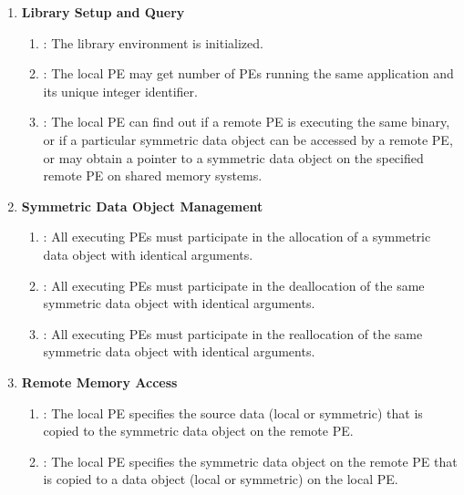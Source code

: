 \begin{enumerate}
\item \textbf{Library Setup and Query}

\begin{enumerate}
\item {}: The \openshmem library environment is initialized. 
\item {}: The local \ac{PE} may get number of \acp{PE} running the same application and its unique integer identifier. 
\item {}: The local \ac{PE} can find out if a remote \ac{PE} is executing the same binary, or if a particular symmetric data object can be accessed by a remote \ac{PE}, or may obtain a pointer to a symmetric data object on the specified remote \ac{PE} on shared memory systems.
\end{enumerate}

\item \textbf{Symmetric Data Object Management}
\begin{enumerate}
\item {}: All executing \ac{PE}s must participate in the allocation of a symmetric data object with identical arguments.
\item  {}: All executing \ac{PE}s must participate in the deallocation of the same symmetric data object with identical arguments.
\item  {}: All executing \ac{PE}s must participate in the reallocation of the same symmetric data object with identical arguments.
\end{enumerate}

\item \textbf{Remote Memory Access}

\begin{enumerate}
\item {}: The local \ac{PE} specifies the source
data (local or symmetric) that is copied to the symmetric data object on the remote \ac{PE}. 
\item {}: The local \ac{PE} specifies the symmetric data object on the remote \ac{PE}
that is copied to a data object (local or symmetric) on the local \ac{PE}. 
\end{enumerate}


\end{enumerate}
